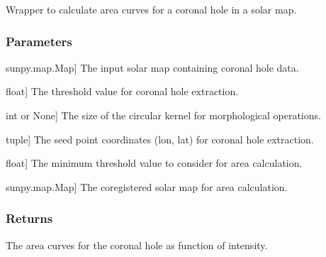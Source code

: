 \documentclass[letterpaper,10pt,english]{sphinxmanual}
\begin{document}
\begin{fulllineitems}
\label{\detokenize{pycatch/utils/ch_mapping:pycatch.utils.ch_mapping.calc_area_curves}}
\pysigstartsignatures
{}
\pysigstopsignatures
\sphinxAtStartPar
Wrapper to calculate area curves for a coronal hole in a solar map.


\subsubsection{Parameters}
\label{\detokenize{pycatch/utils/ch_mapping:parameters}}\begin{description}
\sphinxlineitem{map}{[}sunpy.map.Map{]}
\sphinxAtStartPar
The input solar map containing coronal hole data.

\sphinxlineitem{th}{[}float{]}
\sphinxAtStartPar
The threshold value for coronal hole extraction.

\sphinxlineitem{kernel}{[}int or None{]}
\sphinxAtStartPar
The size of the circular kernel for morphological operations.

\sphinxlineitem{seed}{[}tuple{]}
\sphinxAtStartPar
The seed point coordinates (lon, lat) for coronal hole extraction.

\sphinxlineitem{minval}{[}float{]}
\sphinxAtStartPar
The minimum threshold value to consider for area calculation.

\sphinxlineitem{coreg}{[}sunpy.map.Map{]}
\sphinxAtStartPar
The coregistered solar map for area calculation.

\end{description}


\subsubsection{Returns}
\label{\detokenize{pycatch/utils/ch_mapping:returns}}\begin{description}
\sphinxAtStartPar
The area curves for the coronal hole as function of intensity.

\end{description}

\end{fulllineitems}

\end{document}
